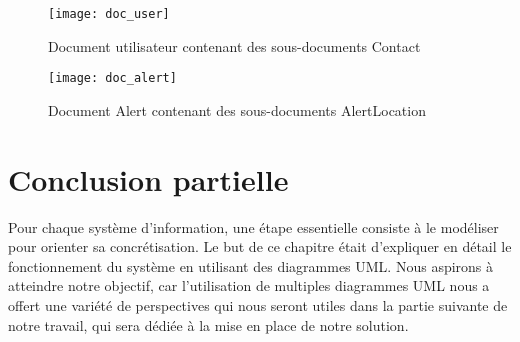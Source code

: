 \begin{figure}[H]
	\centering
	\texttt{[image: doc\_user]}
	\caption{Document utilisateur contenant des sous-documents Contact}
\end{figure}

\begin{figure}[H]
	\centering
	\texttt{[image: doc\_alert]}
	\caption{Document Alert contenant des sous-documents AlertLocation}
\end{figure}

\section{Conclusion partielle}
Pour chaque système d'information, une étape essentielle consiste à le modéliser pour orienter sa concrétisation. Le but de ce chapitre était d'expliquer en détail le fonctionnement du système en utilisant des diagrammes UML. Nous aspirons à atteindre notre objectif, car l'utilisation de multiples diagrammes UML nous a offert une variété de perspectives qui nous seront utiles dans la partie suivante de notre travail, qui sera dédiée à la mise en place de notre solution.


